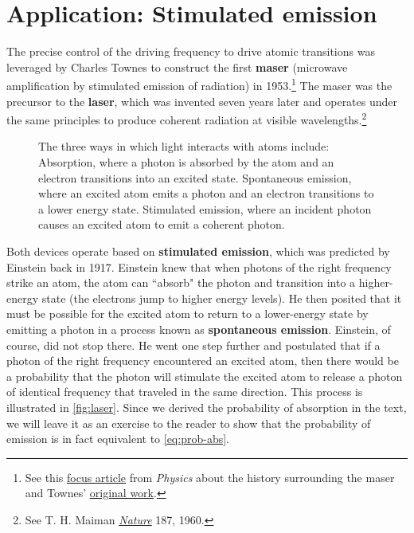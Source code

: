 \section{Application: Stimulated emission}

The precise control of the driving frequency to drive atomic transitions was leveraged by Charles Townes to construct the first \textbf{maser} (microwave amplification by stimulated emission of radiation) in 1953.\footnote{See this \href{https://physics.aps.org/story/v15/st4}{focus article} from \emph{Physics} about the history surrounding the maser and Townes' \href{https://journals.aps.org/pr/abstract/10.1103/PhysRev.99.1264}{original work}.} 
The maser was the precursor to the \textbf{laser}, which was invented seven years later and operates under the same principles to produce coherent radiation at visible wavelengths.\footnote{See T. H. Maiman \href{https://www.nature.com/articles/187493a0}{\emph{Nature}} 187, 1960.}

\begin{figure}[!h]
	\centering
	 \qquad 
	 \qquad 
	\caption{The three ways in which light interacts with atoms include: \protect{} Absorption, where a photon is absorbed by the atom and an electron transitions into an excited state. \protect{} Spontaneous emission, where an excited atom emits a photon and an electron transitions to a lower energy state. \protect{} Stimulated emission, where an incident photon causes an excited atom to emit a coherent photon.}
	\label{fig:laser}
\end{figure}

Both devices operate based on \textbf{stimulated emission}, which was predicted by Einstein back in 1917. 
Einstein knew that when photons of the right frequency strike an atom, the atom can ``absorb" the photon and transition into a higher-energy state (the electrons jump to higher energy levels). 
He then posited that it must be possible for the excited atom to return to a lower-energy state by emitting a photon in a process known as \textbf{spontaneous emission}. 
Einstein, of course, did not stop there. 
He went one step further and postulated that if a photon of the right frequency encountered an excited atom, then there would be a probability that the photon will stimulate the excited atom to release a photon of identical frequency that traveled in the same direction. 
This process is illustrated in \autoref{fig:laser}. 
Since we derived the probability of absorption in the text, we will leave it as an exercise to the reader to show that the probability of emission is in fact equivalent to \autoref{eq:prob-abs}.


